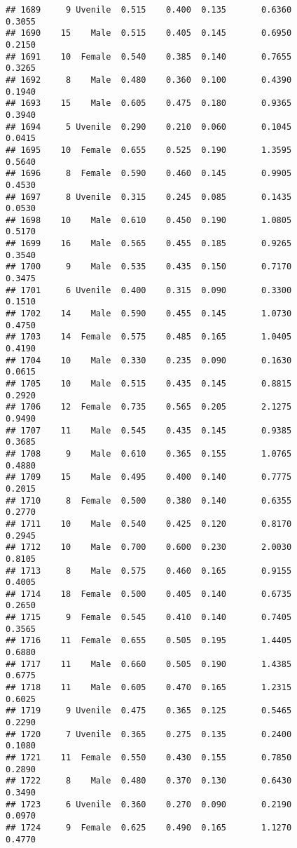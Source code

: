 \documentclass[
]{article}
\begin{document}
\begin{verbatim}
## 1689     9 Uvenile  0.515    0.400  0.135       0.6360         0.3055
## 1690    15    Male  0.515    0.405  0.145       0.6950         0.2150
## 1691    10  Female  0.540    0.385  0.140       0.7655         0.3265
## 1692     8    Male  0.480    0.360  0.100       0.4390         0.1940
## 1693    15    Male  0.605    0.475  0.180       0.9365         0.3940
## 1694     5 Uvenile  0.290    0.210  0.060       0.1045         0.0415
## 1695    10  Female  0.655    0.525  0.190       1.3595         0.5640
## 1696     8  Female  0.590    0.460  0.145       0.9905         0.4530
## 1697     8 Uvenile  0.315    0.245  0.085       0.1435         0.0530
## 1698    10    Male  0.610    0.450  0.190       1.0805         0.5170
## 1699    16    Male  0.565    0.455  0.185       0.9265         0.3540
## 1700     9    Male  0.535    0.435  0.150       0.7170         0.3475
## 1701     6 Uvenile  0.400    0.315  0.090       0.3300         0.1510
## 1702    14    Male  0.590    0.455  0.145       1.0730         0.4750
## 1703    14  Female  0.575    0.485  0.165       1.0405         0.4190
## 1704    10    Male  0.330    0.235  0.090       0.1630         0.0615
## 1705    10    Male  0.515    0.435  0.145       0.8815         0.2920
## 1706    12  Female  0.735    0.565  0.205       2.1275         0.9490
## 1707    11    Male  0.545    0.435  0.145       0.9385         0.3685
## 1708     9    Male  0.610    0.365  0.155       1.0765         0.4880
## 1709    15    Male  0.495    0.400  0.140       0.7775         0.2015
## 1710     8  Female  0.500    0.380  0.140       0.6355         0.2770
## 1711    10    Male  0.540    0.425  0.120       0.8170         0.2945
## 1712    10    Male  0.700    0.600  0.230       2.0030         0.8105
## 1713     8    Male  0.575    0.460  0.165       0.9155         0.4005
## 1714    18  Female  0.500    0.405  0.140       0.6735         0.2650
## 1715     9  Female  0.545    0.410  0.140       0.7405         0.3565
## 1716    11  Female  0.655    0.505  0.195       1.4405         0.6880
## 1717    11    Male  0.660    0.505  0.190       1.4385         0.6775
## 1718    11    Male  0.605    0.470  0.165       1.2315         0.6025
## 1719     9 Uvenile  0.475    0.365  0.125       0.5465         0.2290
## 1720     7 Uvenile  0.365    0.275  0.135       0.2400         0.1080
## 1721    11  Female  0.550    0.430  0.155       0.7850         0.2890
## 1722     8    Male  0.480    0.370  0.130       0.6430         0.3490
## 1723     6 Uvenile  0.360    0.270  0.090       0.2190         0.0970
## 1724     9  Female  0.625    0.490  0.165       1.1270         0.4770

\end{verbatim}
\end{document}
